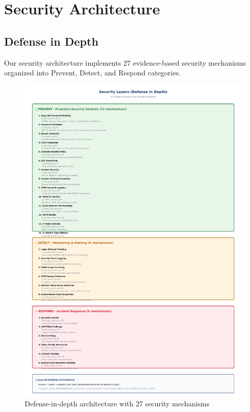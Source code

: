 \documentclass[12pt,a4paper]{article}
\begin{document}
\section{Security Architecture}

\subsection{Defense in Depth}

Our security architecture implements 27 evidence-based security mechanisms organized into Prevent, Detect, and Respond categories.

\begin{figure}[H]
    \centering
    \includegraphics[width=\textwidth,height=0.9\textheight,keepaspectratio]{diagrams/7_security_layers.png}
    \caption{Defense-in-depth architecture with 27 security mechanisms}
    \label{fig:security_layers}
\end{figure}
\end{document}
